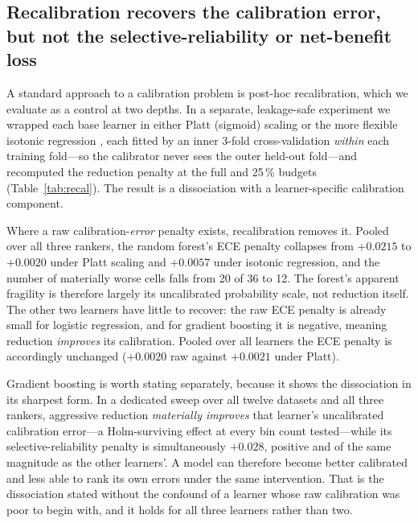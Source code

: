 \documentclass[fleqn,10pt]{wlscirep}
\newcommand{\result}[1]{#1}
\begin{document}
\subsection{Recalibration recovers the calibration error, but not the selective-reliability or
net-benefit loss}
\label{sec:recal}
A standard approach to a calibration problem is post-hoc recalibration, which we evaluate as a control
at two depths. In a separate, leakage-safe experiment we wrapped each base learner in either Platt
(sigmoid) scaling or the more flexible isotonic regression \cite{niculescu2005predicting}, each fitted by an inner 3-fold
cross-validation \emph{within} each training fold---so the calibrator never sees the outer held-out
fold---and recomputed the reduction penalty at the full and 25\,\% budgets (Table~\ref{tab:recal}). The
result is a dissociation with a learner-specific calibration component.

Where a raw calibration-\emph{error} penalty exists, recalibration removes it. Pooled over all three
rankers, the random forest's ECE penalty collapses from \result{$+0.0215$} to \result{$+0.0020$}
under Platt scaling and \result{$+0.0057$} under isotonic regression, and the number of materially
worse cells falls from \result{20} of \result{36} to \result{12}. The forest's apparent fragility is
therefore largely its uncalibrated probability scale, not reduction itself. The other two learners
have little to recover: the raw ECE penalty is already small for logistic regression, and for
gradient boosting it is negative, meaning reduction \emph{improves} its calibration. Pooled over all
learners the ECE penalty is accordingly unchanged (\result{$+0.0020$} raw against \result{$+0.0021$}
under Platt).

Gradient boosting is worth stating separately, because it shows the dissociation in its sharpest
form. In a dedicated sweep over all twelve datasets and all three rankers, aggressive reduction
\emph{materially improves} that learner's uncalibrated calibration error---a Holm-surviving effect at
every bin count tested---while its selective-reliability penalty is simultaneously
\result{$+0.028$}, positive and of the same magnitude as the other learners'. A model can therefore
become better calibrated and less able to rank its own errors under the same intervention. That is
the dissociation stated without the confound of a learner whose raw calibration was poor to begin
with, and it holds for all three learners rather than two.
\end{document}
